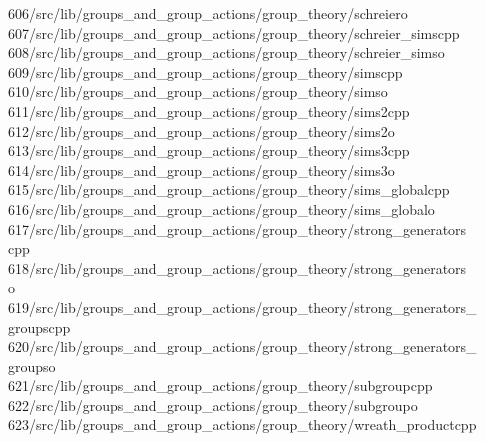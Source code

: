 \begin{tabbing}
606\>/src/lib/groups\_and\_group\_actions/group\_theory/schreiero\\[0pt]
607\>/src/lib/groups\_and\_group\_actions/group\_theory/schreier\_simscpp\\[0pt]
608\>/src/lib/groups\_and\_group\_actions/group\_theory/schreier\_simso\\[0pt]
609\>/src/lib/groups\_and\_group\_actions/group\_theory/simscpp\\[0pt]
610\>/src/lib/groups\_and\_group\_actions/group\_theory/simso\\[0pt]
611\>/src/lib/groups\_and\_group\_actions/group\_theory/sims2cpp\\[0pt]
612\>/src/lib/groups\_and\_group\_actions/group\_theory/sims2o\\[0pt]
613\>/src/lib/groups\_and\_group\_actions/group\_theory/sims3cpp\\[0pt]
614\>/src/lib/groups\_and\_group\_actions/group\_theory/sims3o\\[0pt]
615\>/src/lib/groups\_and\_group\_actions/group\_theory/sims\_globalcpp\\[0pt]
616\>/src/lib/groups\_and\_group\_actions/group\_theory/sims\_globalo\\[0pt]
617\>/src/lib/groups\_and\_group\_actions/group\_theory/strong\_generators\\[0pt]
\>cpp\\[0pt]
618\>/src/lib/groups\_and\_group\_actions/group\_theory/strong\_generators\\[0pt]
\>o\\[0pt]
619\>/src/lib/groups\_and\_group\_actions/group\_theory/strong\_generators\_\\[0pt]
\>groupscpp\\[0pt]
620\>/src/lib/groups\_and\_group\_actions/group\_theory/strong\_generators\_\\[0pt]
\>groupso\\[0pt]
621\>/src/lib/groups\_and\_group\_actions/group\_theory/subgroupcpp\\[0pt]
622\>/src/lib/groups\_and\_group\_actions/group\_theory/subgroupo\\[0pt]
623\>/src/lib/groups\_and\_group\_actions/group\_theory/wreath\_productcpp\\[0pt]

\end{tabbing}
